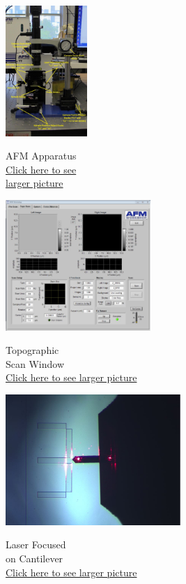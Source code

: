 \documentclass{../lab}
\begin{document}
\begin{figure}[H]
  \href{http://experimentationlab.berkeley.edu/sites/default/files/AFMImages/AFMgen.jpg}{\includegraphics[height=140pt,keepaspectratio]{images/AFMgen.jpg}}
  \centering
  \caption{\centering AFM Apparatus \\ \href{http://experimentationlab.berkeley.edu/sites/default/files/AFMImages/AFMgen.jpg}{Click here to see \\ larger picture}}
  \label{fig:Apparatus}
\endminipage\hfill
{}
  \href{http://experimentationlab.berkeley.edu/sites/default/files/AFMImages/toposcan.JPG}{\includegraphics[height=140pt,keepaspectratio]{images/toposcan.JPG}}
  \caption{\centering Topographic \\ Scan Window \\
  \href{http://experimentationlab.berkeley.edu/sites/default/files/AFMImages/toposcan.JPG}{Click here to see larger picture}}
  \label{fig:TopoScan}
\endminipage\hfill
{}
  \href{http://experimentationlab.berkeley.edu/sites/default/files/AFMImages/bothfocused.JPG}{\includegraphics[height=140pt,keepaspectratio]{images/bothfocused2.jpg}}
  \centering
  \caption{\centering Laser Focused \\on Cantilever \\
  \href{http://experimentationlab.berkeley.edu/sites/default/files/AFMImages/bothfocused.JPG}{Click here to see larger picture}}
  \label{fig:CantileverLaser}
\endminipage
\end{figure}
\end{document}
